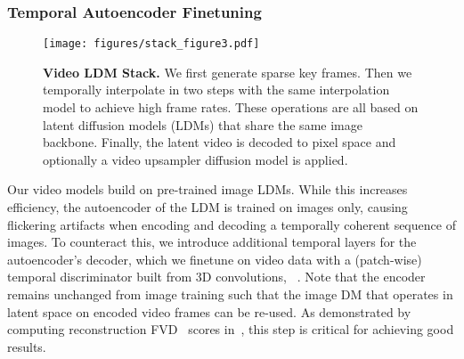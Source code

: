 \subsubsection{Temporal Autoencoder Finetuning}
\label{sec:dec_finetuna}
\begin{figure}[t!]
  \vspace{-0.4cm}
    \texttt{[image: figures/stack\_figure3.pdf]}
    \caption{\small \textbf{Video LDM Stack.} We first generate sparse key frames. Then we temporally interpolate in two steps with the same interpolation model to achieve high frame rates. These operations are all based on latent diffusion models (LDMs) that share the same image backbone. Finally, the latent video is decoded to pixel space and optionally a video upsampler diffusion model is applied.} 
    \label{fig:stack_figure}
  \vspace{-4mm}
\end{figure}Our video models build on pre-trained image LDMs. While this increases efficiency, the autoencoder of the LDM is trained on images only, causing flickering artifacts when encoding and decoding a temporally coherent sequence of images. %
To counteract this, we introduce additional temporal layers for the autoencoder's decoder, which we finetune on video data with a (patch-wise) temporal discriminator built from 3D convolutions, \cf ~. Note that the encoder remains unchanged from image training such that the image DM that operates in latent space on encoded video frames can be re-used.
As demonstrated by computing reconstruction FVD~\cite{unterthiner2018towards} scores in~, this step is critical for achieving good results.

